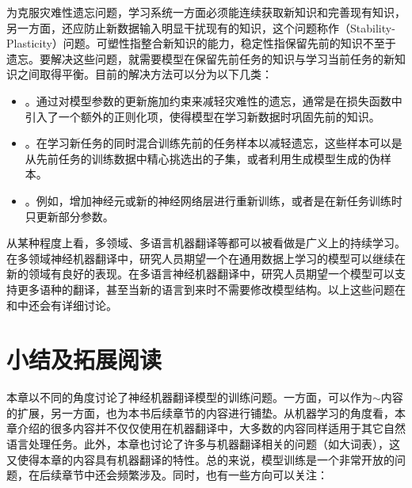 \parinterval 为克服灾难性遗忘问题，学习系统一方面必须能连续获取新知识和完善现有知识，另一方面，还应防止新数据输入明显干扰现有的知识，这个问题称作{\small{}}（Stability-Plasticity）问题。可塑性指整合新知识的能力，稳定性指保留先前的知识不至于遗忘。要解决这些问题，就需要模型在保留先前任务的知识与学习当前任务的新知识之间取得平衡。目前的解决方法可以分为以下几类：

\begin{itemize}
\vspace{0.5em}
\item {\small{}}。通过对模型参数的更新施加约束来减轻灾难性的遗忘，通常是在损失函数中引入了一个额外的正则化项，使得模型在学习新数据时巩固先前的知识。
\vspace{0.5em}
\item {\small{}}。在学习新任务的同时混合训练先前的任务样本以减轻遗忘，这些样本可以是从先前任务的训练数据中精心挑选出的子集，或者利用生成模型生成的伪样本。
\vspace{0.5em}
\item {\small{}}。例如，增加神经元或新的神经网络层进行重新训练，或者是在新任务训练时只更新部分参数。
\vspace{0.5em}
\end{itemize}

\parinterval 从某种程度上看，多领域、多语言机器翻译等都可以被看做是广义上的持续学习。在多领域神经机器翻译中，研究人员期望一个在通用数据上学习的模型可以继续在新的领域有良好的表现。在多语言神经机器翻译中，研究人员期望一个模型可以支持更多语种的翻译，甚至当新的语言到来时不需要修改模型结构。以上这些问题在{\chaptersixteen}和{\chaptereighteen}中还会有详细讨论。


\sectionnewpage
\section{小结及拓展阅读}

\parinterval 本章以不同的角度讨论了神经机器翻译模型的训练问题。一方面，可以作为{\chapternine}$\sim${\chaptertwelve}内容的扩展，另一方面，也为本书后续章节的内容进行铺垫。从机器学习的角度看，本章介绍的很多内容并不仅仅使用在机器翻译中，大多数的内容同样适用于其它自然语言处理任务。此外，本章也讨论了许多与机器翻译相关的问题（如大词表），这又使得本章的内容具有机器翻译的特性。总的来说，模型训练是一个非常开放的问题，在后续章节中还会频繁涉及。同时，也有一些方向可以关注：

